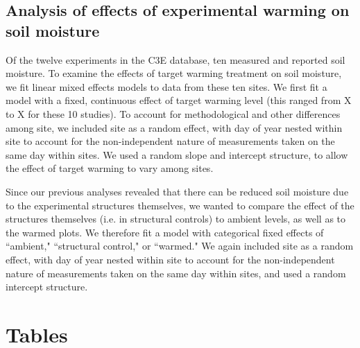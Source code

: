 \documentclass{article}
\begin{document}
\subsection* {Analysis of effects of experimental warming on soil moisture}
Of the twelve experiments in the C3E database, ten measured and reported soil moisture. To examine the effects of target warming treatment on soil moisture, we fit linear mixed effects models to data from these ten sites. We first fit a model with a fixed, continuous effect of target warming level (this ranged from X to X for these 10 studies). To account for methodological and other differences among site, we included site as a random effect, with day of year nested within site to account for the non-independent nature of measurements taken on the same day within sites.  We used a random slope and intercept structure, to allow the effect of target warming to vary among sites. 
\par Since our previous analyses revealed that there can be reduced soil moisture due to the experimental structures themselves, we wanted to compare the effect of the structures themselves (i.e. in structural controls) to ambient levels, as well as to the warmed plots. We therefore fit a model with categorical fixed effects of ``ambient," ``structural control," or ``warmed."  We again included site as a random effect, with day of year nested within site to account for the non-independent nature of measurements taken on the same day within sites, and used a random intercept structure. 


\clearpage


\section* {Tables}
\end{document}
